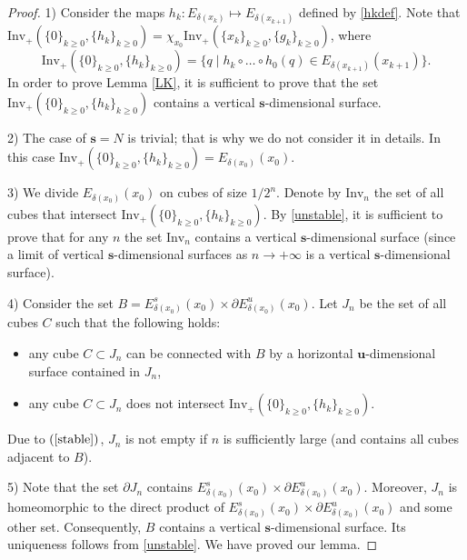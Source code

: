 \documentclass[11pt]{article}
\newcounter{razdel}[section]
\theoremstyle{Mystyle}
\newtheorem{Remark}[razdel]{Remark}
\begin{document}
\begin{proof}
1) Consider the maps $h_{k}: E_{\delta(x_k)}\mapsto E_{\delta(x_{k+1})}$ defined by \eqref{hkdef}. Note that $\mbox{Inv}_+(\{0\}_{k\geq0},\{h_{k}\}_{k\geq0})=\chi_{x_0}\mbox{Inv}_+(\{x_k\}_{k\geq0},\{g_k\}_{k\geq0})$,
where $$\mbox{Inv}_+(\{0\}_{k\geq0},\{h_{k}\}_{k\geq0}) = \{q\mid h_{k}\circ\ldots\circ h_{0}(q)\in E_{\delta(x_{k+1})}(x_{k+1})\}.$$ 
In order to prove Lemma \ref{LK}, it is sufficient to prove that the set 
$\mbox{Inv}_+(\{0\}_{k\geq0},\{h_{k}\}_{k\geq0})$ contains a vertical $\textbf{s}$-dimensional surface.

2) The case of $\textbf{s}=N$ is trivial; that is why we do not consider it in details. In this case 
$\mbox{Inv}_+(\{0\}_{k\geq0},\{h_{k}\}_{k\geq0}) = E_{\delta(x_0)}(x_0)$.

3) We divide $E_{\delta(x_0)}(x_0)$ on cubes of size $1/2^n$. Denote by $\mbox{Inv}_n$ the set of all cubes that 
intersect $\mbox{Inv}_+(\{0\}_{k\geq0},\{h_{k}\}_{k\geq0})$.
By \eqref{unstable}, it is sufficient to prove that for any $n$ the set $\mbox{Inv}_n$ contains a vertical $\textbf{s}$-dimensional surface (since a limit of vertical $\textbf{s}$-dimensional surfaces as $n\rightarrow+\infty$ is a vertical $\textbf{s}$-dimensional surface).

4) Consider the set $B = E^s_{\delta(x_0)}(x_0)\times\partial E^u_{\delta(x_0)}(x_0)$. 
Let $J_n$ be the set of all cubes $C$ 
such that the following holds:
\begin{itemize}
	\item any cube $C\subset J_n$ can be connected with $B$ by a horizontal $\textbf{u}$-dimensional surface contained in $J_n$,
	\item any cube $C\subset J_n$ does not intersect $\mbox{Inv}_+(\{0\}_{k\geq0},\{h_{k}\}_{k\geq0})$. 
\end{itemize}
Due to $(\ref{stable})$, $J_n$ is not empty if $n$ is sufficiently large (and contains all cubes adjacent to $B$). 

5) Note that the set $\partial J_n$ contains $E^s_{\delta(x_0)}(x_0)\times\partial E^u_{\delta(x_0)}(x_0)$. Moreover, $J_n$ is homeomorphic to the direct product of $E^s_{\delta(x_0)}(x_0)\times\partial E^u_{\delta(x_0)}(x_0)$ and some other set. Consequently, $B$ contains a vertical $\textbf{s}$-dimensional surface. Its uniqueness follows from \eqref{unstable}. We have proved our lemma.
\end{proof}

\end{document}
